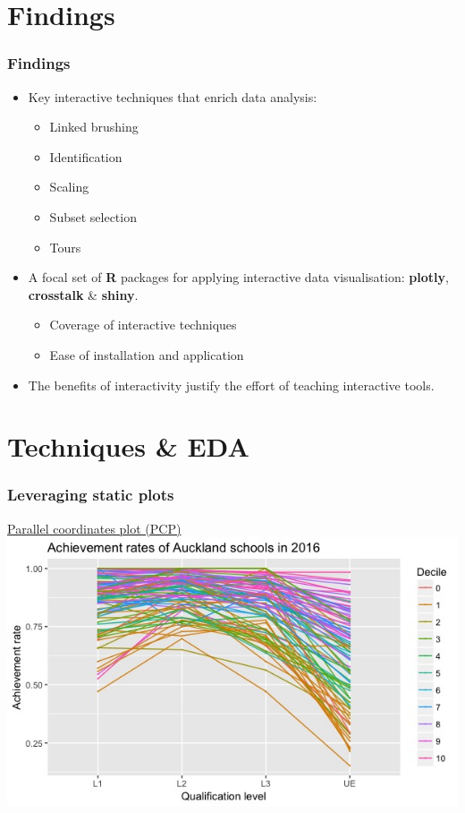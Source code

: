 \documentclass{beamer}
\begin{document}
\section{Findings}
\label{sec:findings}

	\begin{frame}
		\frametitle{Findings}
		\begin{itemize}
			\item Key interactive techniques that enrich data analysis:
			\begin{itemize}
				\item Linked brushing
				\item Identification
				\item Scaling
				\item Subset selection
				\item Tours
			\end{itemize}
			\item A focal set of \textbf{R} packages for applying interactive data visualisation: \textbf{plotly}, \textbf{crosstalk} \& \textbf{shiny}.
			\begin{itemize}
				\item Coverage of interactive techniques
				\item Ease of installation and application
			\end{itemize}
		\item The benefits of interactivity justify the effort of teaching interactive tools.
		\end{itemize}
	\end{frame}

\section{Techniques \& EDA}
\label{sec:techniques}

	\begin{frame}
		\frametitle{Leveraging static plots}
		\href{https://shanl33.shinyapps.io/presentation_pcp/}{Parallel coordinates plot (PCP)} 
		\href{https://screencast-o-matic.com/watch/cbXlcM2oyE}{\beamergotobutton{Demo}}
		\includegraphics[scale=0.45]{files/pcp.jpeg}
	\end{frame}
\end{document}
